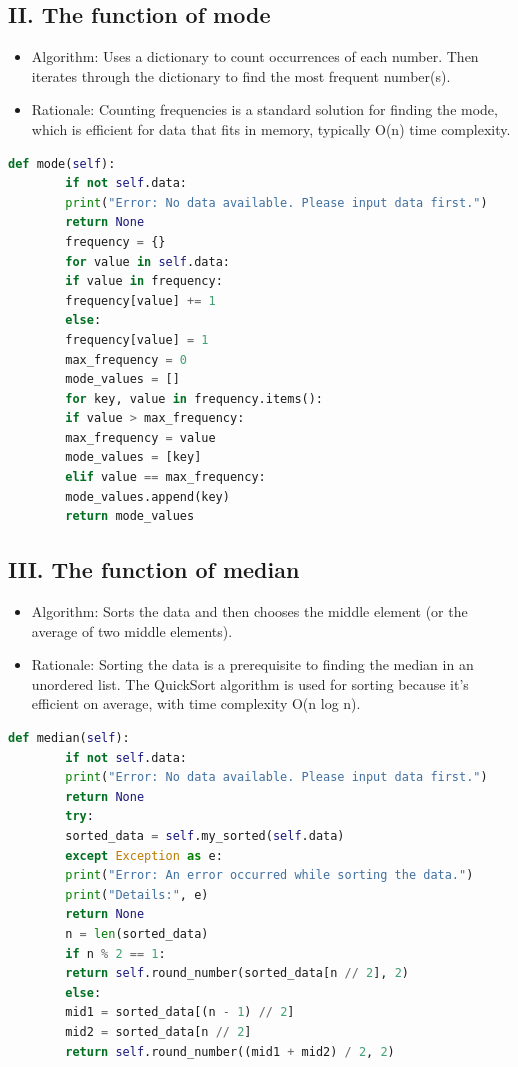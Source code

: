 \documentclass[english,12pt,a4paper]{report}
\begin{document}
	\subsection*{II. The function of mode}
	\begin{itemize}[leftmargin=*]
		\item Algorithm: Uses a dictionary to count occurrences of each number. Then iterates through the dictionary to find the most frequent number(s).
		\item Rationale: Counting frequencies is a standard solution for finding the mode, which is efficient for data that fits in memory, typically O(n) time complexity.
	\end{itemize}
	\begin{lstlisting}[language=Python, caption=Mode Method]
		def mode(self):
		if not self.data:
		print("Error: No data available. Please input data first.")
		return None
		frequency = {}
		for value in self.data:
		if value in frequency:
		frequency[value] += 1
		else:
		frequency[value] = 1
		max_frequency = 0
		mode_values = []
		for key, value in frequency.items():
		if value > max_frequency:
		max_frequency = value
		mode_values = [key]
		elif value == max_frequency:
		mode_values.append(key)
		return mode_values
	\end{lstlisting}
	\subsection*{III. The function of median}
	\begin{itemize}[leftmargin=*]
		\item Algorithm: Sorts the data and then chooses the middle element (or the average of two middle elements).
		\item Rationale: Sorting the data is a prerequisite to finding the median in an unordered list. The QuickSort algorithm is used for sorting because it's efficient on average, with time complexity O(n log n).
	\end{itemize}
	\begin{lstlisting}[language=Python, caption=Median Method]
		def median(self):
		if not self.data:
		print("Error: No data available. Please input data first.")
		return None
		try:
		sorted_data = self.my_sorted(self.data)
		except Exception as e:
		print("Error: An error occurred while sorting the data.")
		print("Details:", e)
		return None
		n = len(sorted_data)
		if n % 2 == 1:
		return self.round_number(sorted_data[n // 2], 2)
		else:
		mid1 = sorted_data[(n - 1) // 2]
		mid2 = sorted_data[n // 2]
		return self.round_number((mid1 + mid2) / 2, 2)
	\end{lstlisting}
	
\end{document}
